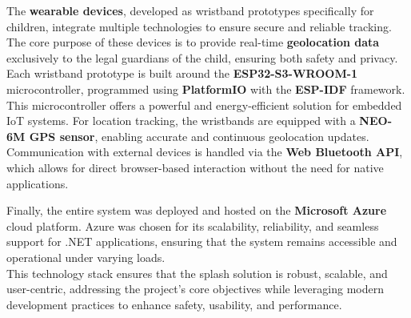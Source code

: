 The \textbf{wearable devices}, developed as wristband prototypes specifically for children, integrate multiple technologies to ensure secure and reliable tracking. The core purpose of these devices is to provide real-time \textbf{geolocation data} exclusively to the legal guardians of the child, ensuring both safety and privacy. 
Each wristband prototype is built around the \textbf{ESP32-S3-WROOM-1} microcontroller, programmed using \textbf{PlatformIO} with the \textbf{ESP-IDF} framework. This microcontroller offers a powerful and energy-efficient solution for embedded IoT systems. For location tracking, the wristbands are equipped with a \textbf{NEO-6M GPS sensor}, enabling accurate and continuous geolocation updates. Communication with external devices is handled via the \textbf{Web Bluetooth API}, which allows for direct browser-based interaction without the need for native applications.

Finally, the entire system was deployed and hosted on the \textbf{Microsoft Azure} cloud platform. Azure was chosen for its scalability, reliability, and seamless support for .NET applications, ensuring that the system remains accessible and operational under varying loads. \\

This technology stack ensures that the \ac{splash} solution is robust, scalable, and user-centric, addressing the project’s core objectives while leveraging modern development practices to enhance safety, usability, and performance.

